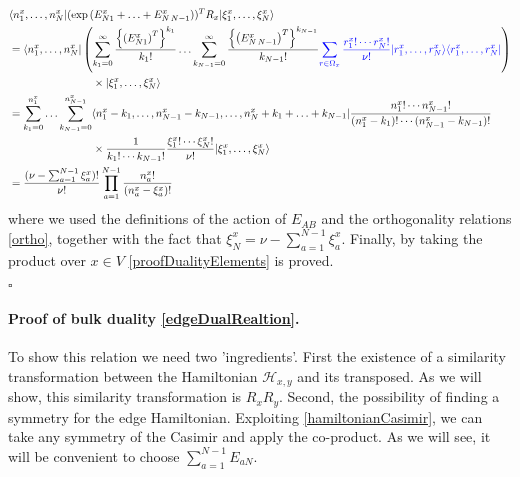 \documentclass[10pt]{article}
\numberwithin{equation}{section}
\numberwithin{equation}{subsection}
\newcommand{\fra}[1]{\textcolor[rgb]{0,0,1}{#1}}
\begin{document}
\begin{align}
&\langle n_{1}^{x},\ldots,n_{N}^{x}|(\exp{(E_{N1}^{x}+\ldots+E_{N\,N-1}^{x})})^{T}R_{x}|\xi_{1}^{x},\ldots,\xi_{N}^{x}\rangle\nonumber\\&= \langle  n_{1}^{x},\ldots,n_{N}^{x}|\left(\sum_{k_{1}=0}^{\infty}\frac{\left\{\left(E_{N1}^{x}\right)^{T}\right\}^{k_{1}}}{k_{1}!}\ldots\sum_{k_{N-1}=0}^{\infty}\frac{\left\{\left(E_{N\,N-1}^{x}\right)^{T}\right\}^{k_{N-1}}}{k_{N-1}!}\fra{\sum_{r\in\Omega_{x}}\frac{r_{1}^{x}!\cdots r_{N}^{x}!}{\nu!}|r_{1}^{x},\ldots,r_{N}^{x}\rangle\langle r_{1}^{x},\ldots,r_{N}^{x}|}\right)\nonumber
\\&
\hspace{2.cm}\qquad\times |\xi_{1}^{x},\ldots,\xi_{N}^{x}\rangle\nonumber
\\&=
\sum_{k_{1}=0}^{n_{1}^{x}}\ldots\sum_{k_{N-1}=0}^{n_{N-1}^{x}}\langle n_{1}^{x}-k_{1},\ldots,n_{N-1}^{x}-k_{N-1},\ldots,n_{N}^{x}+k_{1}+\ldots+k_{N-1}|\frac{n_{1}^{x}!\cdots n_{N-1}^{x}!}{(n_{1}^{x}-k_{1})!\cdots(n_{N-1}^{x}-k_{N-1})!}\nonumber
\\& 
\hspace{2.cm}\qquad\times \frac{1}{k_{1}!\cdots k_{N-1}!}\frac{\xi_{1}^{x}!\cdots \xi_{N}^{x}!}{\nu!}|\xi_{1}^{x},\ldots,\xi_{N}^{x}\rangle\nonumber
\\&=
\frac{(\nu-\sum_{a=1}^{N-1}\xi_{a}^{x})!}{\nu!}\prod_{a=1}^{N-1}\frac{n_{a}^{x}!}{(n_{a}^{x}-\xi_{a}^{x})!}
\end{align}
where we used the definitions of the action of $E_{AB}$  and the orthogonality relations \eqref{ortho}, together with the fact that $\xi_{N}^{x}=\nu-\sum_{a=1}^{N-1}\xi_{a}^{x}$. 
Finally, by taking the product over $x\in V$ \eqref{proofDualityElements} is proved.
\begin{flushright}
    $\square$
\end{flushright}


\paragraph{Proof of bulk duality \eqref{edgeDualRealtion}.}To show this relation we need two 'ingredients'. First the existence of a similarity transformation between the Hamiltonian $\mathcal{H}_{x,y}$  and its transposed. As we will show, this similarity transformation is $R_{x}R_{y}$.  Second, the possibility of finding a symmetry for the edge Hamiltonian. Exploiting \eqref{hamiltonianCasimir}, we can take any symmetry of the Casimir and apply the co-product. As we will see, it will be convenient to choose $\sum_{a=1}^{N-1}E_{aN}$. 
\end{document}
